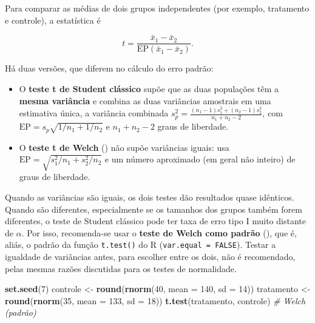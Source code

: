 \documentclass[
]{book}
\newenvironment{Shaded}{\begin{snugshade}}{\end{snugshade}}
\newcommand{\AttributeTok}[1]{\textcolor[rgb]{0.13,0.29,0.53}{#1}}
\newcommand{\CommentTok}[1]{\textcolor[rgb]{0.56,0.35,0.01}{\textit{#1}}}
\newcommand{\DecValTok}[1]{\textcolor[rgb]{0.00,0.00,0.81}{#1}}
\newcommand{\FunctionTok}[1]{\textcolor[rgb]{0.13,0.29,0.53}{\textbf{#1}}}
\newcommand{\NormalTok}[1]{#1}
\newcommand{\OtherTok}[1]{\textcolor[rgb]{0.56,0.35,0.01}{#1}}
\providecommand{\tightlist}{%
  \setlength{\itemsep}{0pt}\setlength{\parskip}{0pt}}
\begin{document}
Para comparar as médias de dois grupos independentes (por exemplo, tratamento e controle), a estatística é

\[
t = \frac{\bar{x}_1 - \bar{x}_2}{\text{EP}(\bar{x}_1 - \bar{x}_2)}.
\]

Há duas versões, que diferem no cálculo do erro padrão:

\begin{itemize}
\tightlist
\item
  O \textbf{teste t de Student clássico} supõe que as duas populações têm a \textbf{mesma variância} e combina as duas variâncias amostrais em uma estimativa única, a variância combinada \(s_p^2 = \frac{(n_1 - 1)s_1^2 + (n_2 - 1)s_2^2}{n_1 + n_2 - 2}\), com \(\text{EP} = s_p\sqrt{1/n_1 + 1/n_2}\) e \(n_1 + n_2 - 2\) graus de liberdade.
\item
  O \textbf{teste t de Welch} () não supõe variâncias iguais: usa \(\text{EP} = \sqrt{s_1^2/n_1 + s_2^2/n_2}\) e um número aproximado (em geral não inteiro) de graus de liberdade.
\end{itemize}

Quando as variâncias são iguais, os dois testes dão resultados quase idênticos. Quando são diferentes, especialmente se os tamanhos dos grupos também forem diferentes, o teste de Student clássico pode ter taxa de erro tipo I muito distante de \(\alpha\). Por isso, recomenda-se usar o \textbf{teste de Welch como padrão} (), que é, aliás, o padrão da função \texttt{t.test()} do R (\texttt{var.equal\ =\ FALSE}). Testar a igualdade de variâncias antes, para escolher entre os dois, não é recomendado, pelas mesmas razões discutidas para os testes de normalidade.

\begin{Shaded}
\begin{Highlighting}[]
\FunctionTok{set.seed}\NormalTok{(}\DecValTok{7}\NormalTok{)}
\NormalTok{controle   }\OtherTok{\textless{}{-}} \FunctionTok{round}\NormalTok{(}\FunctionTok{rnorm}\NormalTok{(}\DecValTok{40}\NormalTok{, }\AttributeTok{mean =} \DecValTok{140}\NormalTok{, }\AttributeTok{sd =} \DecValTok{14}\NormalTok{))}
\NormalTok{tratamento }\OtherTok{\textless{}{-}} \FunctionTok{round}\NormalTok{(}\FunctionTok{rnorm}\NormalTok{(}\DecValTok{35}\NormalTok{, }\AttributeTok{mean =} \DecValTok{133}\NormalTok{, }\AttributeTok{sd =} \DecValTok{18}\NormalTok{))}
\FunctionTok{t.test}\NormalTok{(tratamento, controle)          }\CommentTok{\# Welch (padrão)}
\end{Highlighting}
\end{Shaded}
\end{document}
